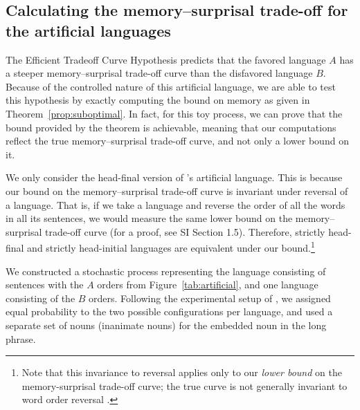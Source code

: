 \subsection{Calculating the memory--surprisal trade-off for the artificial languages}

The Efficient Tradeoff Curve Hypothesis predicts that the favored language $A$ has a steeper memory--surprisal trade-off curve than the disfavored language $B$. Because of the controlled nature of this artificial language, we are able to test this hypothesis by exactly computing the bound on memory as given in Theorem~\ref{prop:suboptimal}. In fact, for this toy process, we can prove that the bound provided by the theorem is achievable, meaning that our computations reflect the true memory--surprisal trade-off curve, and not only a lower bound on it.

We only consider the head-final version of \citet{fedzechkina-human-2017}'s artificial language. This is because our bound on the memory--surprisal trade-off curve is invariant under reversal of a language. That is, if we take a language and reverse the order of all the words in all its sentences, we would measure the same lower bound on the memory--surprisal trade-off curve (for a proof, see SI Section 1.5). Therefore, strictly head-final and strictly head-initial languages are equivalent under our bound.\footnote{Note that this invariance to reversal applies only to our \emph{lower bound} on the memory-surprisal trade-off curve; the true curve is not generally invariant to word order reversal \citep{crutchfield-times-2009}.} 


We constructed a stochastic process representing the language consisting of sentences with the $A$ orders from Figure~\ref{tab:artificial}, and one language consisting of the $B$ orders. Following the experimental setup of \cite{fedzechkina-human-2017}, we assigned equal probability to the two possible configurations per language, and used a separate set of nouns (inanimate nouns) for the embedded noun in the long phrase.

